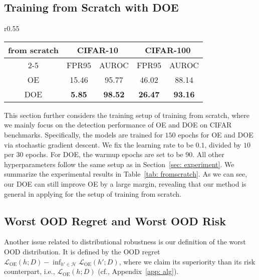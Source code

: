 \documentclass{article} \usepackage{iclr2022_conference,times}
\begin{document}
\subsection{Training from Scratch with DOE}



\begin{wraptable}{r}{0.55\textwidth}
\caption{Comparison of OE and DOE when training from scratch on CIFAR benchmarks.} \label{tab: fromscratch}
\centering
\small
\begin{tabular}{c|cc|cc}
\toprule[1.5pt]  
\multirow{2}{*}{from scratch} & \multicolumn{2}{c|}{CIFAR-10} & \multicolumn{2}{c}{CIFAR-100} \\
\cline{2-5}
                              & FPR95         & AUROC        & FPR95         & AUROC         \\
\midrule[0.6pt]
OE                            & 15.46         & 95.77        & 46.02         & 88.14         \\
DOE                           & \textbf{5.85}          & \textbf{98.52}        & \textbf{26.47}         & \textbf{93.16}         \\
\bottomrule[1.5pt]  
\end{tabular}
\end{wraptable}

This section further considers the training setup of training from scratch, where we mainly focus on the detection performance of OE and DOE on CIFAR benchmarks. Specifically, the models are trained for $150$ epochs for OE and DOE via stochastic gradient descent. We fix the learning rate to be $0.1$, divided by $10$ per $30$ epochs. For DOE, the warmup epochs are set to be $90$. All other hyperparameters follow the same setup as in Section~\ref{sec: experiment}. We summarize the experimental results in Table~\ref{tab: fromscratch}. As we can see, our DOE can still improve OE by a large margin, revealing that our method is general in applying for the setup of training from scratch.


\subsection{Worst OOD Regret and Worst OOD Risk} 
Another issue related to distributional robustness is our definition of the worst OOD distribution. It is defined by the OOD regret ${\mathcal{L}}_\text{OE} (h; D) - \inf_{h'\in\mathcal{H}} {\mathcal{L}}_\text{OE} (h'; D)$, where we claim its superiority than its risk counterpart, i.e., ${\mathcal{L}}_\text{OE} (h; D)$ {(cf., Appendix~\ref{app: alg})}. 
\end{document}
